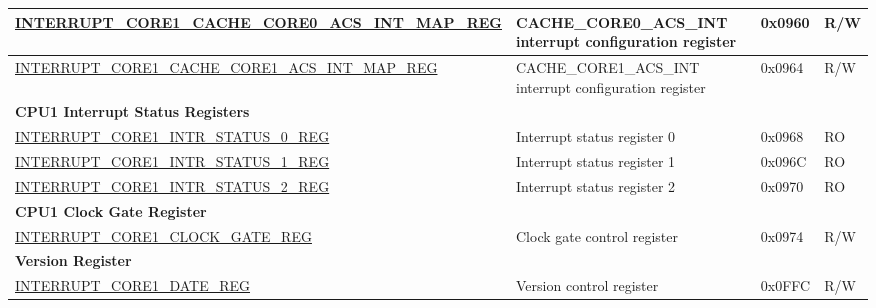 \begin{landscape}
\begin{longtable}{ | p{10cm} | p{10.2cm} | p{1.3cm} | p{1cm} | }
\hyperref[regdesc:INTERRUPTCORE1CACHECORE0ACSINTMAPREG]{INTERRUPT\_CORE1\_CACHE\_CORE0\_ACS\_INT\_MAP\_REG} & CACHE\_CORE0\_ACS\_INT interrupt configuration register & 0x0960 & R/W \\ \hline
\hyperref[regdesc:INTERRUPTCORE1CACHECORE1ACSINTMAPREG]{INTERRUPT\_CORE1\_CACHE\_CORE1\_ACS\_INT\_MAP\_REG} & CACHE\_CORE1\_ACS\_INT interrupt configuration register & 0x0964 & R/W \\ \hline
\multicolumn{4}{|l|}{\textbf{CPU1 Interrupt Status Registers}} \\ \hline
\hyperref[regdesc:INTERRUPTCORE1INTRSTATUS0REG]{INTERRUPT\_CORE1\_INTR\_STATUS\_0\_REG} & Interrupt status register 0 & 0x0968 & RO \\ \hline
\hyperref[regdesc:INTERRUPTCORE1INTRSTATUS1REG]{INTERRUPT\_CORE1\_INTR\_STATUS\_1\_REG} & Interrupt status register 1 & 0x096C & RO \\ \hline
\hyperref[regdesc:INTERRUPTCORE1INTRSTATUS2REG]{INTERRUPT\_CORE1\_INTR\_STATUS\_2\_REG} & Interrupt status register 2 & 0x0970 & RO \\ \hline
\multicolumn{4}{|l|}{\textbf{CPU1 Clock Gate Register}} \\ \hline
\hyperref[regdesc:INTERRUPTCORE1CLOCKGATEREG]{INTERRUPT\_CORE1\_CLOCK\_GATE\_REG} & Clock gate control register & 0x0974 & R/W \\ \hline
\multicolumn{4}{|l|}{\textbf{Version Register}} \\ \hline
\hyperref[regdesc:INTERRUPTCORE1DATEREG]{INTERRUPT\_CORE1\_DATE\_REG} & Version control register & 0x0FFC & R/W \\ \hline
\end{longtable}
\end{landscape}

